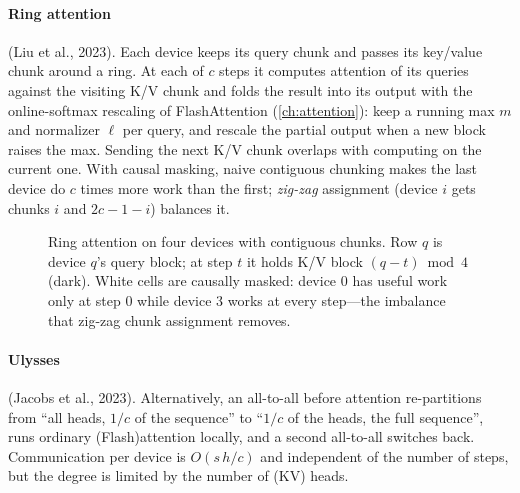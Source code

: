 \paragraph{Ring attention} (Liu et al., 2023). Each device keeps its query chunk and passes its
key/value chunk around a ring. At each of $c$ steps it computes attention of its queries
against the visiting K/V chunk and folds the result into its output with the online-softmax
rescaling of FlashAttention (\cref{ch:attention}): keep a running max $m$ and normalizer
$\ell$ per query, and rescale the partial output when a new block raises the max. Sending the
next K/V chunk overlaps with computing on the current one. With causal masking, naive
contiguous chunking makes the last device do $c$ times more work than the first;
\emph{zig-zag} assignment (device $i$ gets chunks $i$ and $2c-1-i$) balances it.

\begin{figure}[t]
\centering
{}
\caption{Ring attention on four devices with contiguous chunks. Row $q$ is device $q$'s query
block; at step $t$ it holds K/V block $(q-t)\bmod 4$ (dark). White cells are causally masked:
device 0 has useful work only at step 0 while device 3 works at every step---the imbalance that
zig-zag chunk assignment removes.}
\label{fig:dist:ringattn}
\end{figure}

\paragraph{Ulysses} (Jacobs et al., 2023). Alternatively, an all-to-all before attention
re-partitions from ``all heads, $1/c$ of the sequence'' to ``$1/c$ of the heads, the full
sequence'', runs ordinary (Flash)attention locally, and a second all-to-all switches back.
Communication per device is $O(s\,h/c)$ and independent of the number of steps, but the degree
is limited by the number of (KV) heads.

